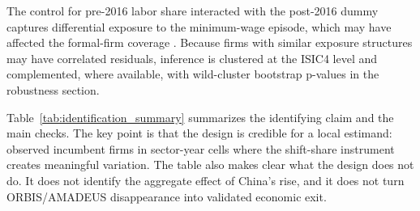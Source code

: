 ﻿\documentclass[12pt]{article}
\begin{document}
The control for pre-2016 labor share interacted with the post-2016 dummy captures differential exposure to the minimum-wage episode, which may have affected the formal-firm coverage \parencite{akcigitFactsBusinessDynamism2020}. Because firms with similar exposure structures may have correlated residuals, inference is clustered at the ISIC4 level and complemented, where available, with wild-cluster bootstrap p-values in the robustness section.

Table~\ref{tab:identification_summary} summarizes the identifying claim and the main checks. The key point is that the design is credible for a local estimand: observed incumbent firms in sector-year cells where the shift-share instrument creates meaningful variation. The table also makes clear what the design does not do. It does not identify the aggregate effect of China's rise, and it does not turn ORBIS/AMADEUS disappearance into validated economic exit.
\end{document}
